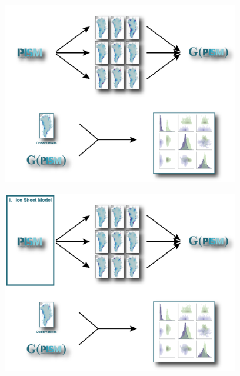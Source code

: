\documentclass[aspectratio=169,hide notes,intlimits]{beamer}
\begin{document}
\begin{frame}{}
  \vspace{-1.5em}
    \begin{minipage}[t][8.2cm][t]{\textwidth}
    \begin{figure}
      \includegraphics[height=8cm]{surrogate_model_clean}
    \end{figure}
    \end{minipage}
\end{frame}

\begin{frame}{}
  \vspace{-1.5em}
    \begin{minipage}[t][8.2cm][t]{\textwidth}
    \begin{figure}
      \includegraphics[height=8cm]{surrogate_model_1}
    \end{figure}
    \end{minipage}
\end{frame}
\end{document}
